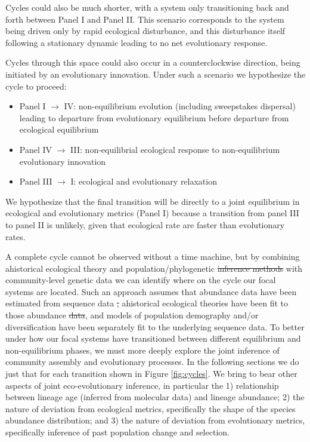 \documentclass[12pt]{article}
\providecommand{\DIFaddtex}[1]{{\protect\color{blue}\uwave{#1}}} %
\providecommand{\DIFdeltex}[1]{{\protect\color{red}\sout{#1}}}                      %
\providecommand{\DIFaddbegin}{} %
\providecommand{\DIFaddend}{} %
\providecommand{\DIFdelbegin}{} %
\providecommand{\DIFdelend}{} %
\providecommand{\DIFadd}[1]{\texorpdfstring{\DIFaddtex{#1}}{#1}} %
\providecommand{\DIFdel}[1]{\texorpdfstring{\DIFdeltex{#1}}{}} %
\begin{document}
\DIFdelend %
Cycles could also be much shorter, with a system only transitioning
back and forth between Panel I and Panel II. This scenario corresponds
to the system being driven only by rapid ecological disturbance, and
this disturbance itself following a stationary dynamic leading to no
net evolutionary response.

Cycles through this space could also occur in a counterclockwise
direction, being initiated by an evolutionary innovation. Under such a
scenario we hypothesize the cycle to proceed:

\begin{itemize}
\item Panel I $\rightarrow$ IV: non-equilibrium evolution (including
  sweepstakes dispersal) leading to departure from evolutionary
  equilibrium before departure from ecological equilibrium
\item Panel IV $\rightarrow$ III: non-equilibrial ecological response
  to non-equilibrium evolutionary innovation
\item Panel III $\rightarrow$ I: ecological and evolutionary
  relaxation
\end{itemize}

We hypothesize that the final transition will be directly to a joint
equilibrium in ecological and evolutionary metrics (Panel I) because a
transition from panel III to panel II is unlikely, given that
ecological rate are faster than evolutionary rates.

A complete cycle cannot be observed without a time machine, but by
combining ahistorical ecological theory and population/phylogenetic
\DIFdelbegin \DIFdel{inference methods }\DIFdelend \DIFaddbegin \DIFadd{models }\DIFaddend with community-level genetic data we can identify
where on the cycle our focal systems are located. Such an approach
assumes that abundance data have been estimated from sequence data \DIFdelbegin \DIFdel{,
}\DIFdelend \DIFaddbegin \DIFadd{or be jointly observed, while
}\DIFaddend ahistorical ecological theories have been fit to those abundance \DIFdelbegin \DIFdel{data}\DIFdelend \DIFaddbegin \DIFadd{proxies}\DIFaddend ,
and models of population demography and/or diversification have been
separately fit to the underlying sequence data. To better under how
our focal systems have transitioned between different equilibrium and
non-equilibrium phases, we must more deeply explore the joint
inference of community assembly and evolutionary processes. In the
following sections we do just that for each transition shown in Figure
\ref{fig:cycles}. We bring to bear other aspects of joint
eco-evolutionary inference, in particular the 1) relationship between
lineage age (inferred from molecular data) and lineage abundance; 2)
the nature of deviation from ecological metrics, specifically the
shape of the species abundance distribution; and 3) the nature of
deviation from evolutionary metrics, specifically inference of past
population change and selection.
\end{document}
